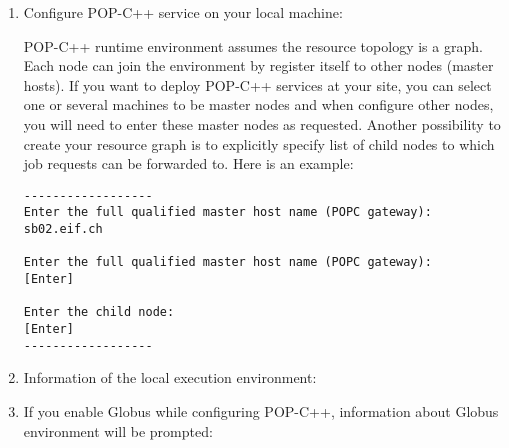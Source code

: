\begin{enumerate}

    \item Configure POP-C++ service on your local machine:

POP-C++ runtime environment assumes the resource topology is a graph.
Each node can join the environment by register itself to other nodes
(master hosts). If you want to deploy POP-C++ services at your site, you
can select one or several machines to be master nodes and when configure
other nodes, you will need to enter these master nodes as requested.
Another possibility to create your resource graph is to explicitly
specify list of child nodes to which job requests can be forwarded to.
Here is an example:

\begin{verbatim}
------------------
Enter the full qualified master host name (POPC gateway):
sb02.eif.ch

Enter the full qualified master host name (POPC gateway):
[Enter]

Enter the child node:
[Enter]
------------------
\end{verbatim}

   \item Information of the local execution environment:


	\item If you enable Globus while configuring POP-C++, information
	about Globus environment will be prompted:


\end{enumerate}

